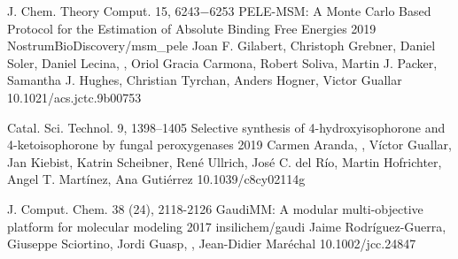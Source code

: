 

\begin{cventries}

  \pubentry
    {J. Chem. Theory Comput. 15, 6243−6253} %
    {PELE-MSM: A Monte Carlo Based Protocol for the Estimation of Absolute Binding Free Energies} %
    {2019} %
    {NostrumBioDiscovery/msm\_pele} %
    {Joan F. Gilabert, Christoph Grebner, Daniel Soler, Daniel Lecina, , Oriol Gracia Carmona, Robert Soliva, Martin J. Packer, Samantha J. Hughes, Christian Tyrchan, Anders Hogner, Victor Guallar} %
    {} %
    {10.1021/acs.jctc.9b00753} %

  \pubentry
    {Catal. Sci. Technol. 9, 1398–1405} %
    {Selective synthesis of 4-hydroxyisophorone and 4-ketoisophorone by fungal peroxygenases} %
    {2019} %
    {} %
    {Carmen Aranda, , Víctor Guallar, Jan Kiebist, Katrin Scheibner, René Ullrich, José C. del Río, Martin Hofrichter,
Angel T. Martínez, Ana Gutiérrez} %
    {} %
    {10.1039/c8cy02114g} %

  \pubentry
    {J. Comput. Chem. 38 (24), 2118-2126} %
    {GaudiMM: A modular multi-objective platform for molecular modeling} %
    {2017} %
    {insilichem/gaudi} %
    {Jaime Rodríguez-Guerra, Giuseppe Sciortino, Jordi Guasp, , Jean-Didier Maréchal} %
    {} %
    {10.1002/jcc.24847} %

\end{cventries}
